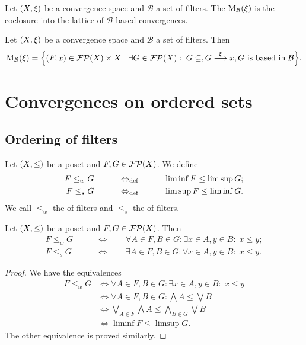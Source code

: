 \begin{definition}
Let $\left( X, \xi \right)$ be a convergence space and $\mathcal{B}$ a set of filters. The  $\operatorname{M}_\mathcal{B}(\xi)$ is the coclosure into the lattice of $\mathcal{B}$-based convergences.
\end{definition}

\begin{lemma}
Let $\left( X, \xi \right)$ be a convergence space and $\mathcal{B}$ a set of filters. Then
\[ \basedMod_\mathcal{B}(\xi) = \setbuilder{(F,x)\in \powerfilters(X)\times X}{\exists G\in \powerfilters(X): \; G\subseteq, G\overset{\xi}{\longrightarrow} x, \text{$G$ is based in $\mathcal{B}$}}. \]
\end{lemma}

\section{Convergences on ordered sets}
\subsection{Ordering of filters}
\begin{definition}
Let $\left( X,\leq \right)$ be a poset and $F,G\in\operatorname{\mathcal{FP}}(X)$. We define
\begin{align*}
F \leq_w G \qquad&\quad\Leftrightarrow_{\text{def}}\quad\qquad \liminf F \leq \limsup G; \\
F \leq_s G \qquad&\quad\Leftrightarrow_{\text{def}}\quad\qquad \limsup F \leq \liminf G.
\end{align*}
We call $\leq_w$ the  of filters and $\leq_s$ the  of filters.
\end{definition}

\begin{lemma} \label{filterInequalityCriterion}
Let $\left( X,\leq \right)$ be a poset and $F,G\in\operatorname{\mathcal{FP}}(X)$. Then
\begin{align*}
F \leq_w G \qquad &\iff\qquad \forall A\in F, B\in G: \exists x\in A, y\in B: \; x \leq y; \\
F \leq_s G \qquad &\iff\qquad \exists A\in F, B\in G: \forall x\in A, y\in B: \; x \leq y.
\end{align*}
\end{lemma}
\begin{proof}
We have the equivalences
\begin{align*}
F \leq_w G &\iff \forall A\in F, B\in G: \exists x\in A, y\in B: \; x \leq y \\
&\iff \forall A\in F, B\in G: \bigwedge A \leq \bigvee B \\
&\iff \bigvee_{A\in F}\bigwedge A \leq \bigwedge_{B\in G}\bigvee B \\
&\iff \liminf F \leq \limsup G.
\end{align*}
The other equivalence is proved similarly.
\end{proof}


